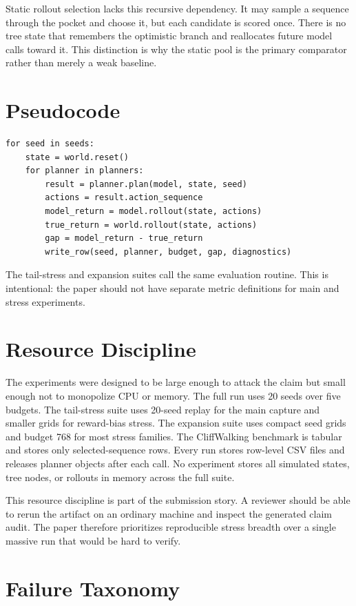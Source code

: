 \documentclass{article}
\begin{document}
Static rollout selection lacks this recursive dependency. It may sample a sequence through the pocket and choose it, but each candidate is scored once. There is no tree state that remembers the optimistic branch and reallocates future model calls toward it. This distinction is why the static pool is the primary comparator rather than merely a weak baseline.

\section{Pseudocode}

\begin{verbatim}
for seed in seeds:
    state = world.reset()
    for planner in planners:
        result = planner.plan(model, state, seed)
        actions = result.action_sequence
        model_return = model.rollout(state, actions)
        true_return = world.rollout(state, actions)
        gap = model_return - true_return
        write_row(seed, planner, budget, gap, diagnostics)
\end{verbatim}

The tail-stress and expansion suites call the same evaluation routine. This is intentional: the paper should not have separate metric definitions for main and stress experiments.

\section{Resource Discipline}

The experiments were designed to be large enough to attack the claim but small enough not to monopolize CPU or memory. The full run uses 20 seeds over five budgets. The tail-stress suite uses 20-seed replay for the main capture and smaller grids for reward-bias stress. The expansion suite uses compact seed grids and budget 768 for most stress families. The CliffWalking benchmark is tabular and stores only selected-sequence rows. Every run stores row-level CSV files and releases planner objects after each call. No experiment stores all simulated states, tree nodes, or rollouts in memory across the full suite.

This resource discipline is part of the submission story. A reviewer should be able to rerun the artifact on an ordinary machine and inspect the generated claim audit. The paper therefore prioritizes reproducible stress breadth over a single massive run that would be hard to verify.

\section{Failure Taxonomy}
\end{document}

